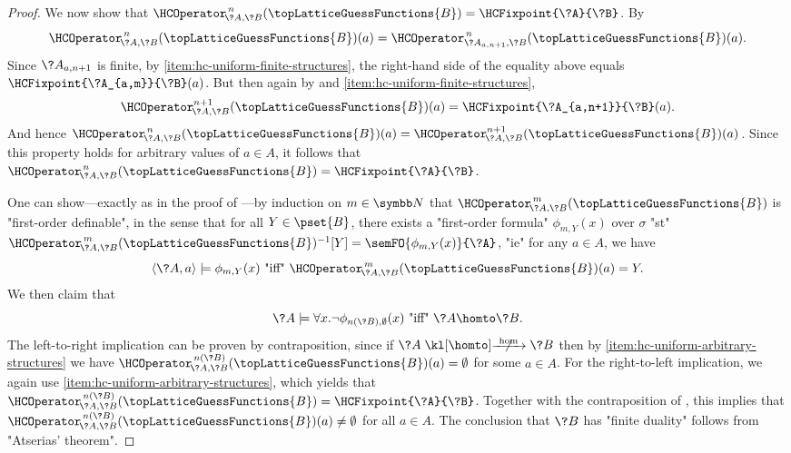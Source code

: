 \begin{proof}
	We now show that $\HCOperator^{\,n}_{\!\?A,\?B}(\topLatticeGuessFunctions{B}) =
	\HCFixpoint{\?A}{\?B}$. By 
	\[\HCOperator^{\,n}_{\!\?A,\?B}(\topLatticeGuessFunctions{B})(a) =
	\HCOperator^{\,n}_{\?A_{a,n+1},\?B}(\topLatticeGuessFunctions{B})(a).\]
	Since $\?A_{a,n+1}$ is finite, by \eqref{item:hc-uniform-finite-structures}, the right-hand side
	of the equality above equals $\HCFixpoint{\?A_{a,m}}{\?B}(a)$.
	But then again by  and \eqref{item:hc-uniform-finite-structures}, 
	\[\HCOperator^{n+1}_{\!\?A,\?B}(\topLatticeGuessFunctions{B})(a) = \HCFixpoint{\?A_{a,n+1}}{\?B}(a).\]
	And hence $\HCOperator^{\,n}_{\!\?A,\?B}(\topLatticeGuessFunctions{B})(a) = \HCOperator^{n+1}_{\!\?A,\?B}(\topLatticeGuessFunctions{B})(a)$. Since this property holds
	for arbitrary values of $a\in A$, it follows that $\HCOperator^{\,n}_{\!\?A,\?B}(\topLatticeGuessFunctions{B}) = \HCFixpoint{\?A}{\?B}$. 

	One can show---exactly as in the proof
	of ---by induction on $m \in \N$
	that $\HCOperator^{\,m}_{\!\?A,\?B}(\topLatticeGuessFunctions{B})$
	is "first-order definable", in the sense that for all $Y \in \pset{B}$,
	there exists a "first-order formula" $\phi_{m,Y}(x)$ over $\sigma$ "st"
	$\HCOperator^{\,m}_{\!\?A,\?B}(\topLatticeGuessFunctions{B})^{-1}[Y] = \semFO{\phi_{m,Y}(x)}{\?A}$,
	"ie" for any $a\in A$, we have
	\[
		\langle \?A, a\rangle \models \phi_{m,Y}(x)
		\text{ "iff" }
		\HCOperator^{\,m}_{\!\?A,\?B}(\topLatticeGuessFunctions{B})(a) = Y.
	\]
	We then claim that
	\[
		\?A \models \forall x. \neg \phi_{n(\?B),\emptyset}(x)
		\text{ "iff" }
		\?A \homto \?B.
	\]
	The left-to-right implication can be proven by contraposition, 
	since if $\?A \nothomto \?B$ then by \eqref{item:hc-uniform-arbitrary-structures}
	we have $\HCOperator^{\,n(\?B)}_{\!\?A,\?B}(\topLatticeGuessFunctions{B})(a) = \emptyset$
	for some $a \in A$.
	For the right-to-left implication, we again use \eqref{item:hc-uniform-arbitrary-structures}, 
	which yields that $\HCOperator^{\,n(\?B)}_{\!\?A,\?B}(\topLatticeGuessFunctions{B}) = \HCFixpoint{\?A}{\?B}$. Together with the contraposition of ,
	this implies that $\HCOperator^{\,n(\?B)}_{\!\?A,\?B}(\topLatticeGuessFunctions{B})(a) \neq \emptyset$ for all $a\in A$. The conclusion that
	$\?B$ has "finite duality" follows from "Atserias' theorem".


\end{proof}

